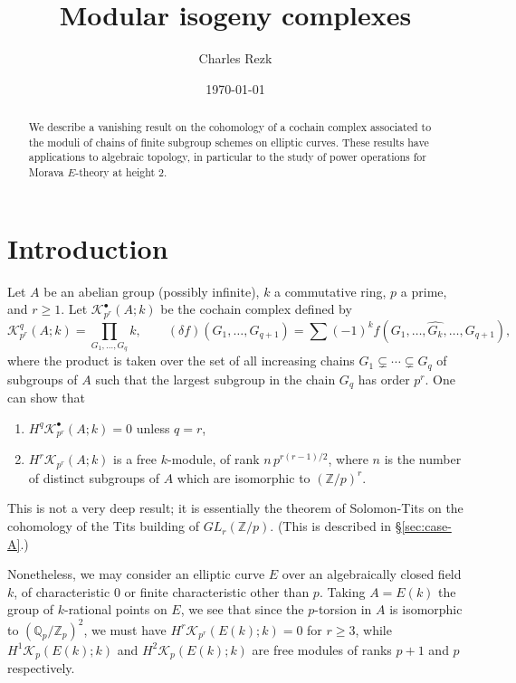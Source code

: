 \documentclass[11pt]{amsart}
\title{Modular isogeny complexes}
\author{Charles Rezk}
\date{ \today}
\numberwithin{equation}{section}
\theoremstyle{plain}
\theoremstyle{remark}
\theoremstyle{plain}
\begin{document}
\begin{abstract}
We describe a vanishing result on the cohomology of a cochain complex
associated to the moduli of chains of finite subgroup schemes on
elliptic curves.  These results have applications to algebraic
topology, in particular to the study of power operations for Morava
$E$-theory at height $2$. 
\end{abstract}

\maketitle

\section{Introduction}

Let $A$ be an abelian group (possibly infinite), $k$ a commutative
ring, $p$ a prime, and $r\geq1$.  Let ${\mathscr{K}}_{p^r}^\bullet(A;k)$ be the
cochain complex defined by 
\[
{\mathscr{K}}_{p^r}^q(A;k) = \prod_{G_1,\dots,G_q} k,\qquad (\delta f)(G_1,\dots,G_{q+1})=\sum(-1)^k
f(G_1,\dots,\widehat{G_k},\dots, G_{q+1}),
\]
where the product is taken over the set of all increasing chains $G_1\subsetneq
\cdots \subsetneq G_q$ of subgroups of $A$ such that the largest
subgroup in the chain $G_q$ has order $p^r$.
One can show that 
\begin{enumerate}
\item $H^q{\mathscr{K}}_{p^r}^\bullet(A;k)=0$ unless $q=r$,
\item $H^r{\mathscr{K}}_{p^r}(A;k)$ is a free $k$-module, of rank $n\,p^{r(r-1)/2}$,
  where $n$ is the number of distinct subgroups of $A$ which are
  isomorphic to $({\mathbb{Z}}/p)^r$.
\end{enumerate}
This is not a very deep result; it is essentially the theorem of
Solomon-Tits on the cohomology of the Tits building of $GL_r({\mathbb{Z}}/p)$.
(This is described in \S\ref{sec:case-A}.)

Nonetheless,  we may consider an elliptic curve $E$ over
an algebraically closed field $k$, of characteristic $0$ or finite
characteristic other than $p$.  Taking $A=E(k)$ the group of
$k$-rational points on $E$, we see that since the $p$-torsion in $A$
is isomorphic to $({\mathbb{Q}}_p/{\mathbb{Z}}_p)^2$, we must have $H^r{\mathscr{K}}_{p^r}(E(k);k)=0$ for
$r\geq3$, while $H^1{\mathscr{K}}_p(E(k);k)$ and $H^2{\mathscr{K}}_p(E(k);k)$ are free
modules of ranks $p+1$ and $p$ respectively.
\end{document}
